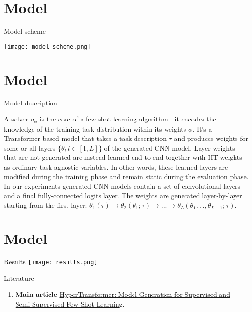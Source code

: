 \documentclass{beamer}
\begin{document}
\section{Model}
\begin{frame}{Model scheme}
    \begin{block}{}
        \texttt{[image: model\_scheme.png]}
    \end{block}
\end{frame}


\section{Model}
\begin{frame}{Model description}
    \begin{block}{}
        A solver $a_\phi$ is the core of a few-shot learning algorithm -
        it encodes the knowledge of the training task distribution within its weights $\phi$. 
        It's a Transformer-based model that takes a task description $\tau$ and produces weights for some or all
        layers $\{\theta_l | l \in [1, L]\}$ of the generated CNN model. Layer
        weights that are not generated are instead learned end-to-end together 
        with HT weights as ordinary task-agnostic variables. 
        In other words, these learned layers are modified
        during the training phase and remain static during the evaluation phase. 
        In our experiments generated CNN models contain a set of convolutional 
        layers and a final fully-connected logits layer. The
        weights are generated layer-by-layer starting from the first
        layer: $\theta_1(\tau ) \rightarrow \theta_2 (\theta_1; \tau ) \rightarrow ... \rightarrow \theta_L(\theta_1,...,\theta_{L-1}; \tau)$.
    \end{block}
\end{frame}

\section{Model}
\begin{frame}{Results}
    \texttt{[image: results.png]}
\end{frame}




\begin{frame}{Literature}
    \begin{enumerate}
        \item \textbf{Main article} \href{https://proceedings.mlr.press/v162/zhmoginov22a/zhmoginov22a.pdf}
        {HyperTransformer: Model Generation for Supervised and Semi-Supervised
        Few-Shot Learning}.
    \end{enumerate}
\end{frame}
\end{document}
